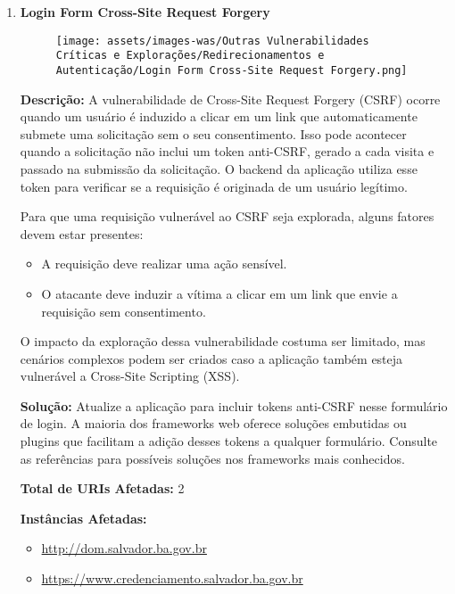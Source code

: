 \documentclass[a4paper,12pt]{article}
\begin{document}
\begin{enumerate}
\item \textbf{Login Form Cross-Site Request Forgery}

                        \begin{figure}[h!]
                        \centering
                        \texttt{[image: assets/images-was/Outras Vulnerabilidades Críticas e Explorações/Redirecionamentos e Autenticação/Login Form Cross-Site Request Forgery.png]}
                        \end{figure}
                        \FloatBarrier
                        \textbf{Descrição:} A vulnerabilidade de Cross-Site Request Forgery (CSRF) ocorre quando um usuário é induzido a clicar em um link que automaticamente submete uma solicitação sem o seu consentimento. Isso pode acontecer quando a solicitação não inclui um token anti-CSRF, gerado a cada visita e passado na submissão da solicitação. O backend da aplicação utiliza esse token para verificar se a requisição é originada de um usuário legítimo.

    Para que uma requisição vulnerável ao CSRF seja explorada, alguns fatores devem estar presentes:
    \begin{itemize}
        \item A requisição deve realizar uma ação sensível.
        \item O atacante deve induzir a vítima a clicar em um link que envie a requisição sem consentimento.
    \end{itemize}
    
    O impacto da exploração dessa vulnerabilidade costuma ser limitado, mas cenários complexos podem ser criados caso a aplicação também esteja vulnerável a Cross-Site Scripting (XSS).

\textbf{Solução:} Atualize a aplicação para incluir tokens anti-CSRF nesse formulário de login. A maioria dos frameworks web oferece soluções embutidas ou plugins que facilitam a adição desses tokens a qualquer formulário. Consulte as referências para possíveis soluções nos frameworks mais conhecidos.

\textbf{Total de URIs Afetadas:} 2

\textbf{Instâncias Afetadas:}
\begin{itemize}
    \item \url{http://dom.salvador.ba.gov.br}
    \item \url{https://www.credenciamento.salvador.ba.gov.br}
\end{itemize}


\end{enumerate}
\end{document}
